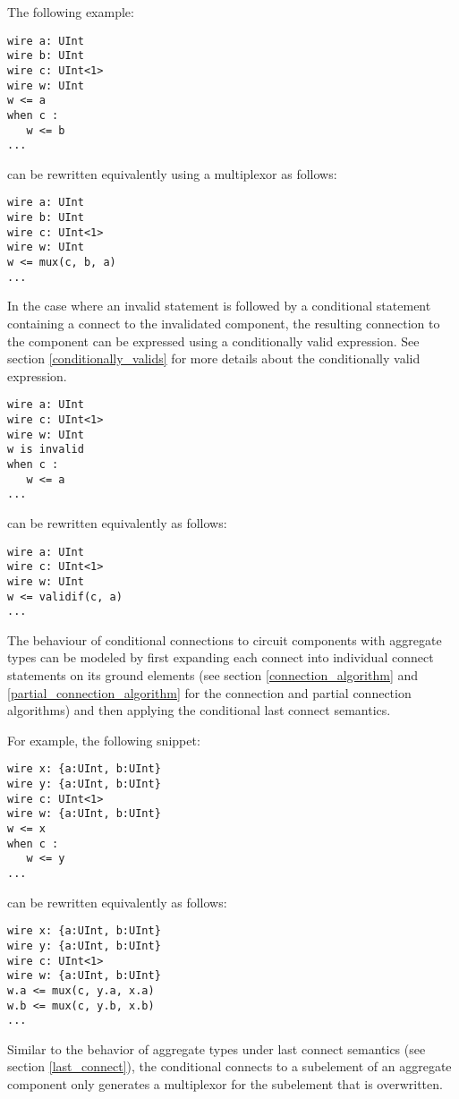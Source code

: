 \documentclass[12pt]{article}
\begin{document}
The following example:
\begin{verbatim}
wire a: UInt
wire b: UInt
wire c: UInt<1>
wire w: UInt
w <= a
when c :
   w <= b
...   
\end{verbatim}
can be rewritten equivalently using a multiplexor as follows:
\begin{verbatim}
wire a: UInt
wire b: UInt
wire c: UInt<1>
wire w: UInt
w <= mux(c, b, a)
...
\end{verbatim}

In the case where an invalid statement is followed by a conditional statement containing a connect to the invalidated component, the resulting connection to the component can be expressed using a conditionally valid expression. See section \ref{conditionally_valids} for more details about the conditionally valid expression.
\begin{verbatim}
wire a: UInt
wire c: UInt<1>
wire w: UInt
w is invalid
when c :
   w <= a
...   
\end{verbatim}
can be rewritten equivalently as follows:
\begin{verbatim}
wire a: UInt
wire c: UInt<1>
wire w: UInt
w <= validif(c, a)
...
\end{verbatim}

The behaviour of conditional connections to circuit components with aggregate types can be modeled by first expanding each connect into individual connect statements on its ground elements (see section \ref{connection_algorithm} and \ref{partial_connection_algorithm} for the connection and partial connection algorithms) and then applying the conditional last connect semantics.

For example, the following snippet:
\begin{verbatim}
wire x: {a:UInt, b:UInt}
wire y: {a:UInt, b:UInt}
wire c: UInt<1>
wire w: {a:UInt, b:UInt}
w <= x
when c :
   w <= y
...   
\end{verbatim}
can be rewritten equivalently as follows:
\begin{verbatim}
wire x: {a:UInt, b:UInt}
wire y: {a:UInt, b:UInt}
wire c: UInt<1>
wire w: {a:UInt, b:UInt}
w.a <= mux(c, y.a, x.a)
w.b <= mux(c, y.b, x.b)
...
\end{verbatim}

Similar to the behavior of aggregate types under last connect semantics (see section \ref{last_connect}), the conditional connects to a subelement of an aggregate component only generates a multiplexor for the subelement that is overwritten.
\end{document}
